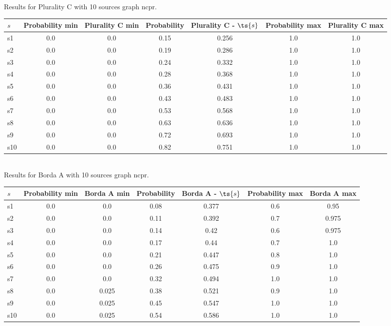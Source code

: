 \documentclass{article}
\begin{document}
\noindent Results for Plurality C with 10 sources graph ncpr.

\noindent\begin{tabular}{|l|c|c|c|c|c|c|}
\hline
$s$& Probability min & Plurality C min & Probability & Plurality C - $\ts{s}$ & Probability max & Plurality C max\\
\hline
s1 &0.0 & 0.0 & 0.15 & 0.256 & 1.0 & 1.0\\
\hline
s2 &0.0 & 0.0 & 0.19 & 0.286 & 1.0 & 1.0\\
\hline
s3 &0.0 & 0.0 & 0.24 & 0.332 & 1.0 & 1.0\\
\hline
s4 &0.0 & 0.0 & 0.28 & 0.368 & 1.0 & 1.0\\
\hline
s5 &0.0 & 0.0 & 0.36 & 0.431 & 1.0 & 1.0\\
\hline
s6 &0.0 & 0.0 & 0.43 & 0.483 & 1.0 & 1.0\\
\hline
s7 &0.0 & 0.0 & 0.53 & 0.568 & 1.0 & 1.0\\
\hline
s8 &0.0 & 0.0 & 0.63 & 0.636 & 1.0 & 1.0\\
\hline
s9 &0.0 & 0.0 & 0.72 & 0.693 & 1.0 & 1.0\\
\hline
s10 &0.0 & 0.0 & 0.82 & 0.751 & 1.0 & 1.0\\
\hline
\end{tabular}\\

\noindent Results for Borda A with 10 sources graph ncpr.

\noindent\begin{tabular}{|l|c|c|c|c|c|c|}
\hline
$s$& Probability min & Borda A min & Probability & Borda A - $\ts{s}$ & Probability max & Borda A max\\
\hline
s1 &0.0 & 0.0 & 0.08 & 0.377 & 0.6 & 0.95\\
\hline
s2 &0.0 & 0.0 & 0.11 & 0.392 & 0.7 & 0.975\\
\hline
s3 &0.0 & 0.0 & 0.14 & 0.42 & 0.6 & 0.975\\
\hline
s4 &0.0 & 0.0 & 0.17 & 0.44 & 0.7 & 1.0\\
\hline
s5 &0.0 & 0.0 & 0.21 & 0.447 & 0.8 & 1.0\\
\hline
s6 &0.0 & 0.0 & 0.26 & 0.475 & 0.9 & 1.0\\
\hline
s7 &0.0 & 0.0 & 0.32 & 0.494 & 1.0 & 1.0\\
\hline
s8 &0.0 & 0.025 & 0.38 & 0.521 & 0.9 & 1.0\\
\hline
s9 &0.0 & 0.025 & 0.45 & 0.547 & 1.0 & 1.0\\
\hline
s10 &0.0 & 0.025 & 0.54 & 0.586 & 1.0 & 1.0\\
\hline
\end{tabular}\\
\end{document}
